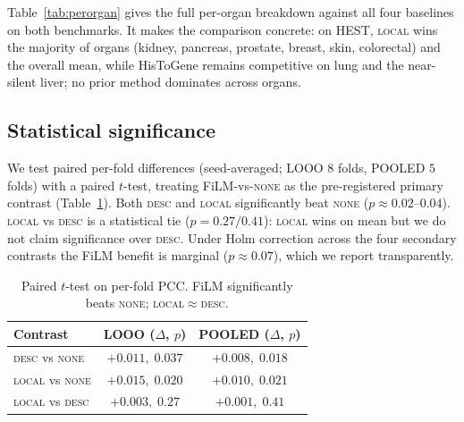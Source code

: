 \documentclass[10pt,twocolumn,letterpaper]{article}
\begin{document}
Table~\ref{tab:perorgan} gives the full per-organ breakdown against all four baselines on both
benchmarks. It makes the comparison concrete: on HEST, \textsc{local} wins the majority of organs
(kidney, pancreas, prostate, breast, skin, colorectal) and the overall mean, while HisToGene
remains competitive on lung and the near-silent liver; no prior method dominates across organs.



\subsection{Statistical significance}
We test paired per-fold differences (seed-averaged; LOOO $8$ folds, POOLED $5$ folds) with a
paired $t$-test, treating FiLM-vs-\textsc{none} as the pre-registered primary contrast
(Table~\ref{tab:sig}). Both \textsc{desc} and \textsc{local} significantly beat \textsc{none}
($p\!\approx\!0.02$--$0.04$). \textsc{local} vs \textsc{desc} is a statistical tie
($p\!=\!0.27/0.41$): \textsc{local} wins on mean but we do not claim significance over
\textsc{desc}. Under Holm correction across the four secondary contrasts the FiLM benefit is
marginal ($p\!\approx\!0.07$), which we report transparently.

\begin{table}[t]
\centering
\small
\setlength{\tabcolsep}{4pt}
\begin{tabular}{lcc}
\toprule
Contrast & LOOO ($\Delta$, $p$) & POOLED ($\Delta$, $p$) \\
\midrule
\textsc{desc} vs \textsc{none}  & $+0.011,\;0.037$ & $+0.008,\;0.018$ \\
\textsc{local} vs \textsc{none} & $+0.015,\;0.020$ & $+0.010,\;0.021$ \\
\textsc{local} vs \textsc{desc} & $+0.003,\;0.27$  & $+0.001,\;0.41$ \\
\bottomrule
\end{tabular}
\caption{Paired $t$-test on per-fold PCC. FiLM significantly beats \textsc{none};
\textsc{local}$\approx$\textsc{desc}.}
\label{tab:sig}
\end{table}
\end{document}
